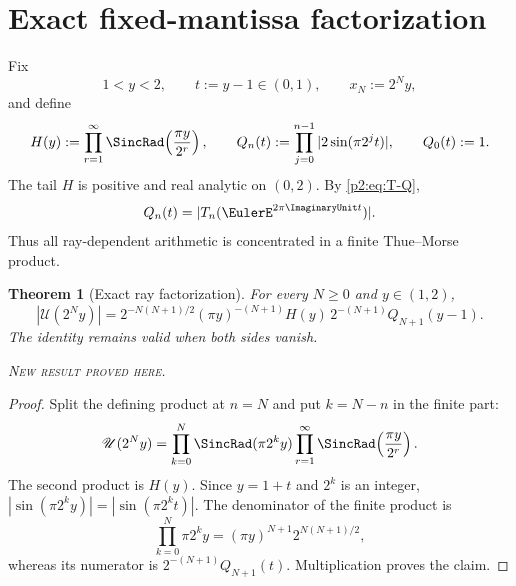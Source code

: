 \documentclass[11pt,oneside]{article}
\newtheorem{theorem}{Theorem}[section]
\theoremstyle{definition}
\theoremstyle{remark}
\newcommand{\newresult}{\textcolor{newgreen}{\textsc{New result proved here.}}}
\begin{document}
\section{Exact fixed-mantissa factorization}\label{p2:sec:factorization}

Fix
\[
 1<y<2,\qquad t:=y-1\in(0,1),\qquad x_N:=2^Ny,
\]
and define
\begin{equation}
 H(y):=\prod_{r=1}^{\infty}\SincRad\!\left(\frac{\pi y}{2^r}\right),
 \qquad
 Q_n(t):=\prod_{j=0}^{n-1}|2\sin(\pi2^jt)|,
 \qquad Q_0(t):=1.
 \label{p2:eq:H-Q-def}
\end{equation}
The tail $H$ is positive and real analytic on $(0,2)$. By \eqref{p2:eq:T-Q},
\begin{equation}
 Q_n(t)=|T_n(\EulerE^{2\pi\ImaginaryUnit t})|.
 \label{p2:eq:Q-as-T}
\end{equation}
Thus all ray-dependent arithmetic is concentrated in a finite Thue--Morse product.

\begin{theorem}[Exact ray factorization]\label{p2:thm:exact-factorization}
For every $N\ge0$ and $y\in(1,2)$,
\begin{equation}
 \boxed{
 |\mathscr U(2^Ny)|
 =2^{-N(N+1)/2}(\pi y)^{-(N+1)}H(y)\,2^{-(N+1)}Q_{N+1}(y-1).}
 \label{p2:eq:exact-factorization}
\end{equation}
The identity remains valid when both sides vanish.

\smallskip\noindent\newresult
\end{theorem}

\begin{proof}
Split the defining product at $n=N$ and put $k=N-n$ in the finite part:
\[
 \mathscr U(2^Ny)=\prod_{k=0}^{N}\SincRad(\pi2^ky)
 \prod_{r=1}^{\infty}\SincRad\!\left(\frac{\pi y}{2^r}\right).
\]
The second product is $H(y)$. Since $y=1+t$ and $2^k$ is an integer,
$|\sin(\pi2^ky)|=|\sin(\pi2^kt)|$. The denominator of the finite product is
\[
 \prod_{k=0}^{N}\pi2^ky=(\pi y)^{N+1}2^{N(N+1)/2},
\]
whereas its numerator is $2^{-(N+1)}Q_{N+1}(t)$. Multiplication proves the claim.
\end{proof}
\end{document}
